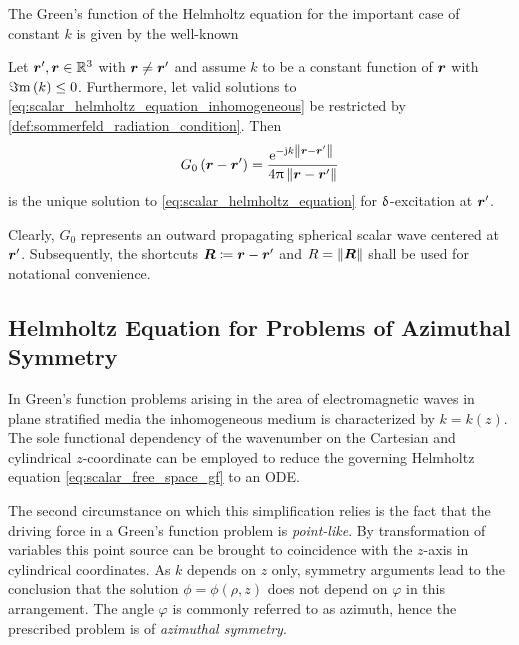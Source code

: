 The Green's function of the Helmholtz equation for the important case of
constant $k$ is given by the well-known \cite{Jackson2013}
\begin{corollary}\label{coll:free_space_gf}
	Let $\rsrc, \robs \in \R^3$ with $\robs \neq \rsrc$ and assume
	$k$ to be a constant function of $\robs$ with $\Im\mathrm{m}\left(k\right) \leq 0$.
	Furthermore, let valid solutions to
	\eqref{eq:scalar_helmholtz_equation_inhomogeneous} be restricted by
	\cref{def:sommerfeld_radiation_condition}.
	Then
	\begin{equation}\label{eq:scalar_free_space_gf}
		G_0 \left( \rdiff \right) =
		\frac{\exp{-\im k \rdiffNorm}}{4\pi \rdiffNorm}
	\end{equation}
	is the unique solution to \eqref{eq:scalar_helmholtz_equation} for
	$\operatorname{\updelta}$-excitation at $\rsrc$.
\end{corollary}

Clearly, $G_0$ represents an outward propagating spherical scalar wave 
centered at $\rsrc$.
Subsequently, the shortcuts $\rdiffSymbol \coloneqq \rdiff$ and
$\rdiffNormSymbol = \norm{\pvec{R}}$ shall be used for notational convenience.







\subsection{Helmholtz Equation for Problems of Azimuthal Symmetry}

In Green's function problems arising in the area of electromagnetic waves
in plane stratified media the inhomogeneous medium is characterized by
$k = k\left(z\right)$.
The sole functional dependency of the wavenumber on the Cartesian and cylindrical 
$z$-coordinate can be employed to reduce the governing Helmholtz
equation \eqref{eq:scalar_free_space_gf} to an \ac{ODE}.

The second circumstance on which this simplification relies is the fact that 
the driving force in a Green's function problem is \emph{point-like}.
By transformation of variables this point source can be brought to
coincidence with the $z$-axis in cylindrical coordinates.
As $k$ depends on $z$ only, symmetry arguments lead to the conclusion that
the solution $\phi = \phi \left(\rho, z\right)$ does not depend on $\varphi$
in this arrangement.
The angle $\varphi$ is commonly referred to as azimuth, hence the prescribed
problem is of \emph{azimuthal symmetry}.

